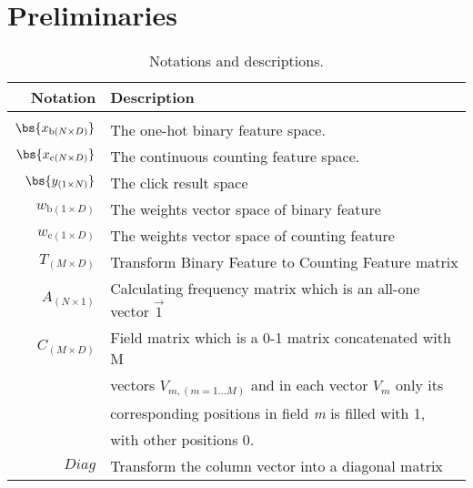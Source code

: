 \chapter{Preliminaries}
\label{chapterlabel3}
\begin{table}[h]
\center
\vspace{-5pt}
\caption{Notations and descriptions.}
\label{tab:notation-des}
\small
\begin{tabular}{rl}
Notation & Description\\
\hline
\\ [-2.0ex]
$\bs{x_{\text{b}(N\times D)}}$ & The one-hot binary feature space.\\
$\bs{x_{\text{c}(N\times D)}}$ & The continuous counting feature space.\\
$\bs{y_{(1\times N)}}$ & The click result space\\
$w_{\text{b}(1\times D)}$ & The weights vector space of binary feature\\
$w_{\text{c}(1\times D)}$ & The weights vector space of counting feature\\
$T_{(M\times D)}$ & Transform Binary Feature to Counting Feature matrix\\
$A_{(N\times 1)}$ & Calculating frequency matrix which is an all-one vector $\vec{1 }$\\
$C_{(M\times D)}$ & Field  matrix which is a 0-1 matrix concatenated with \textsl{}{M} \\
& vectors \(V_{m,(m = 1...M)}\) and in each vector \(V_m\) only its \\
& corresponding positions in field \textsl{m} is filled with 1, \\
& with other positions 0. \\
$Diag$ & Transform the column vector into a diagonal matrix
\end{tabular}
\end{table}
